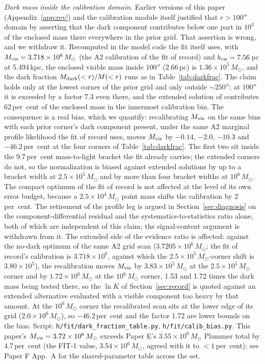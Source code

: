 \documentclass[11pt]{article}
\newcommand{\msun}{\ensuremath{M_\odot}}
\newcommand{\lnK}{\ensuremath{\ln K}}
\begin{document}
\emph{Dark mass inside the calibration domain.} Earlier versions of this paper (Appendix~\ref{app:rev}) and the calibration module itself justified that $r > 100''$ domain by asserting that the dark component contributes below one part in $10^{3}$ of the enclosed mass there everywhere in the prior grid. That assertion is wrong, and we withdraw it. Recomputed in the model code the fit itself uses, with $M_{\rm vis} = 3.718\times10^{6}\,\msun$ (the A2 calibration of the fit of record) and $b_{\rm vis} = 7.56$\,pc at 5.494\,kpc, the enclosed visible mass inside $100''$ (2.66\,pc) is $1.36\times10^{5}\,\msun$, and the dark fraction $M_{\rm dark}(<r)/M(<r)$ runs as in Table~\ref{tab:darkfrac}. The claim holds only at the lowest corner of the prior grid and only outside $\sim 250''$; at $100''$ it is exceeded by a factor 7.3 even there, and the extended solution of \citet{BanaresHernandez2025} contributes 62\,per~cent of the enclosed mass in the innermost calibration bin. The consequence is a real bias, which we quantify: recalibrating $M_{\rm vis}$ on the same bins with each prior corner's dark component present, under the same A2 marginal profile likelihood the fit of record uses, moves $M_{\rm vis}$ by $-0.14$, $-2.0$, $-10.3$ and $-46.2$\,per~cent at the four corners of Table~\ref{tab:darkfrac}. The first two sit inside the 9.7\,per~cent mass-to-light bracket the fit already carries; the extended corners do not, so the normalization is biased against extended solutions by up to a bracket width at $2.5\times10^{5}\,\msun$ and by more than four bracket widths at $10^{6}\,\msun$. The compact optimum of the fit of record is not affected at the level of its own error budget, because a $2.5\times10^{4}\,\msun$ point mass shifts the calibration by 2\,per~cent. The retirement of the profile leg is argued in Section~\ref{sec:diagnosis} on the component-differential residual and the systematics-to-statistics ratio alone, both of which are independent of this claim; the signal-content argument is withdrawn from it. The extended side of the evidence ratio is affected: against the no-dark optimum of the same A2 grid scan ($3.7205\times10^{6}\,\msun$; the fit of record's calibration is $3.718\times10^{6}$, against which the $2.5\times10^{5}\,\msun$-corner shift is $3.80\times10^{5}$), the recalibration moves $M_{\rm vis}$ by $3.83\times10^{5}\,\msun$ at the $2.5\times10^{5}\,\msun$ corner and by $1.72\times10^{6}\,\msun$ at the $10^{6}\,\msun$ corner, 1.53 and 1.72 times the dark mass being tested there, so the $\lnK$ of Section~\ref{sec:record} is quoted against an extended alternative evaluated with a visible component too heavy by that amount. At the $10^{6}\,\msun$ corner the recalibrated scan sits at the lower edge of its grid ($2.0\times10^{6}\,\msun$), so $-46.2$\,per~cent and the factor 1.72 are lower bounds on the bias. Script: \texttt{h/fit/dark\_fraction\_table.py}, \texttt{h/fit/calib\_bias.py}. This paper's $M_{\rm vis} = 3.72\times10^{6}\,\msun$ exceeds Paper E's $3.55\times10^{6}\,\msun$ Plummer total by 4.7\,per~cent (the FIT-1 value, $3.54\times10^{6}\,\msun$, agreed with it to $<1$\,per~cent); see Paper F App.~A for the shared-parameter table across the set.
\end{document}
